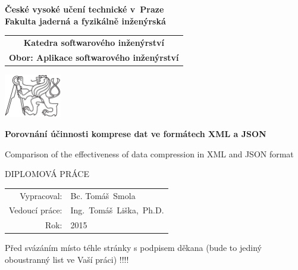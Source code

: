 \documentclass[a4paper,11pt,twoside]{report}
\newcommand{\cvut}{České vysoké učení technické v~Praze}
\newcommand{\fjfi}{Fakulta jaderná a fyzikálně inženýrská}
\newcommand{\kse}{Katedra softwarového inženýrství}
\newcommand{\obor}{Aplikace softwarového inženýrství}
\newcommand{\nazevcz}{Porovnání účinnosti komprese dat ve formátech XML a JSON}        %
\newcommand{\nazeven}{Comparison of the effectiveness of data compression in XML and JSON format}     %
\newcommand{\autor}{Bc. Tomáš~Smola}           %
\newcommand{\rok}{2015}                %
\newcommand{\vedouci}{Ing.~Tomáš~Liška,~Ph.D.}         %
\begin{document}
\thispagestyle{empty}

\begin{center}
    {\Large \bf \cvut\\[2mm] \fjfi }
    \vspace{10mm}

    \begin{tabular}{c}
    {\bf \kse}\\
    {\bf Obor: \obor}\\
    \end{tabular}


   \vspace{10mm} \includegraphics[angle=0, width=25mm]{cvut-logo-bw} \vspace{15mm}

   {\Huge \bf \nazevcz\par \vspace{5mm} \nazeven }

   \vspace{15mm}
   {\Large DIPLOMOVÁ PRÁCE}

   \vfill
   {\large
    \begin{tabular}{rl}
    Vypracoval: & \autor\\
    Vedoucí práce: & \vedouci\\
    Rok: & \rok
    \end{tabular}
   }
\end{center}
\newpage
\thispagestyle{empty}
\mbox{}

\newpage  %
\thispagestyle{empty} Před svázáním místo téhle stránky  s podpisem
děkana (bude to jediný oboustranný list ve Vaší práci) !!!!

\newpage
\thispagestyle{empty}
\mbox{}

\newpage %
\thispagestyle{empty}  %

~ %
\vfill %
\end{document}
